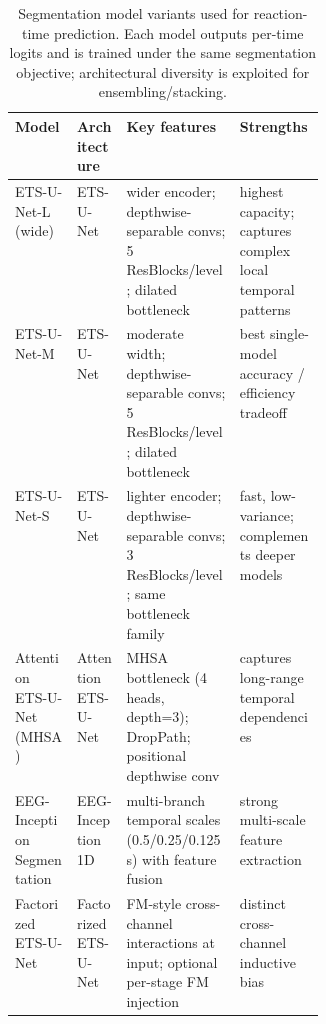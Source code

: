 \documentclass[12pt]{article}
\begin{document}
\begin{table}[t!]
\caption{Segmentation model variants used for reaction-time prediction. Each model outputs per-time logits and is trained under the same segmentation objective; architectural diversity is exploited for ensembling/stacking.}
\label{tab:rt_seg_models}
\small
\centering
\renewcommand{\arraystretch}{1.2}
\setlength{\tabcolsep}{4pt} %

\begin{tabularx}{\linewidth}{@{}
  >{\RaggedRight\arraybackslash}p{0.20\linewidth}
  >{\RaggedRight\arraybackslash}p{0.16\linewidth}
  >{\RaggedRight\arraybackslash}X
  >{\RaggedRight\arraybackslash}X
@{}}
\hline
\textbf{Model} & \textbf{Architecture} & \textbf{Key features} & \textbf{Strengths} \\
\hline

ETS-U-Net-L (wide)
& ETS-U-Net
& wider encoder; depthwise-separable convs; 5 ResBlocks/level; dilated bottleneck
& highest capacity; captures complex local temporal patterns \\

ETS-U-Net-M
& ETS-U-Net
& moderate width; depthwise-separable convs; 5 ResBlocks/level; dilated bottleneck
& best single-model accuracy / efficiency tradeoff \\

ETS-U-Net-S
& ETS-U-Net
& lighter encoder; depthwise-separable convs; 3 ResBlocks/level; same bottleneck family
& fast, low-variance; complements deeper models \\

Attention ETS-U-Net (MHSA)
& Attention ETS-U-Net
& MHSA bottleneck (4 heads, depth=3); DropPath; positional depthwise conv
& captures long-range temporal dependencies \\

EEG-Inception Segmentation
& EEG-Inception 1D
& multi-branch temporal scales (0.5/0.25/0.125\,s) with feature fusion
& strong multi-scale feature extraction \\

Factorized ETS-U-Net
& Factorized ETS-U-Net
& FM-style cross-channel interactions at input; optional per-stage FM injection
& distinct cross-channel inductive bias \\
\hline
\end{tabularx}
\end{table}
\end{document}

